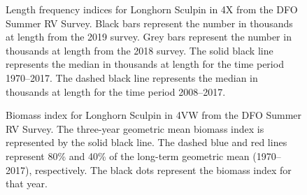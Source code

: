 \documentclass[11pt]{book}
\begin{document}
\begin{figure}[htb]

{\centering {} 

}

\caption{Length frequency indices for Longhorn Sculpin in 4X from the DFO Summer RV Survey. Black bars represent the number in thousands at length from the 2019 survey. Grey bars represent the number in thousands at length from the 2018 survey. The solid black line represents the median in thousands at length for the time period 1970--2017. The dashed black line represents the median in thousands at length for the time period 2008--2017.}\label{fig:77-fig-lsculpin-lengthfreq4X}
\end{figure}

\begin{figure}[htb]

{\centering {} 

}

\caption{Biomass index for Longhorn Sculpin in 4VW from the DFO Summer RV Survey. The three-year geometric mean biomass index is represented by the solid black line. The dashed blue and red lines represent 80\% and 40\% of the long-term geometric mean (1970--2017), respectively. The black dots represent the biomass index for that year.}\label{fig:78-fig-lsculpin-biomass4VW}
\end{figure}
\end{document}
